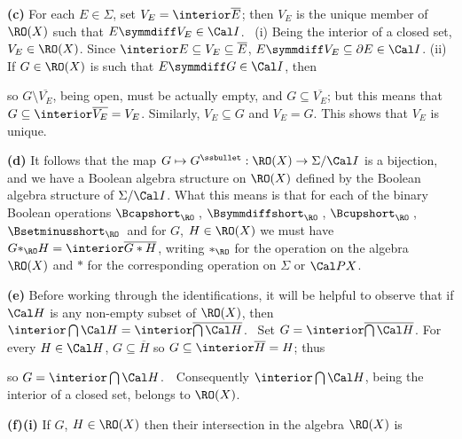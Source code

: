 {\medskip

{\bf (c)} For each $E\in\Sigma$, set $V_E=\interior\overline{E}$;  then
$V_E$ is the unique member of $\RO(X)$ such that
$E\symmdiff V_E\in\Cal I$.
\Prf\ (i) Being the interior of a closed set, $V_E\in\RO(X)$.
Since $\interior E\subseteq V_E\subseteq\overline{E}$,
$E\symmdiff V_E\subseteq\partial E\in\Cal I$.   (ii) If $G\in\RO(X)$ is such that $E\symmdiff G\in\Cal I$, then


\noindent so $G\setminus\overline{V_E}$, being open, must be actually
empty, and $G\subseteq\overline{V_E}$;  but this means that
$G\subseteq\interior\overline{V_E}=V_E$.   Similarly, $V_E\subseteq G$
and $V_E=G$.   This shows that $V_E$ is unique.\ \Qed

\medskip

{\bf (d)} It follows that the map
$G\mapsto G^{\ssbullet}:\RO(X)\to\Sigma/\Cal I$ is a bijection, and we have a Boolean algebra
structure on $\RO(X)$ defined by the Boolean algebra structure of
$\Sigma/\Cal I$.  What this means is that for each of the binary Boolean
operations $\Bcapshort_{\RO}\hskip.2em$,
$\Bsymmdiffshort_{\RO}\hskip.2em$, $\Bcupshort_{\RO}\hskip.2em$,
$\Bsetminusshort_{\RO}\hskip.2em$ and for $G$,
$H\in\RO(X)$ we must have
$G{*}_{\RO}H=\interior\overline{G*H}$,
writing ${*}_{\RO}$ for the operation on the algebra
$\RO(X)$ and $*$ for the corresponding operation on $\Sigma$ or
$\Cal PX$.

\medskip

{\bf (e)} Before working through the identifications, it will be helpful
to observe that if $\Cal H$ is any non-empty subset of $\RO(X)$, then
$\interior\bigcap\Cal H=\interior\overline{\bigcap\Cal H}$.   \Prf\ Set
$G=\interior\overline{\bigcap\Cal H}$.   For every $H\in\Cal H$,
$G\subseteq\overline{H}$ so $G\subseteq\interior\overline{H}=H$;  thus


\noindent so $G=\interior\bigcap\Cal H$.\ \QeD\
Consequently $\interior\bigcap\Cal H$, being the interior of a closed
set, belongs to $\RO(X)$.

\medskip

{\bf (f)(i)} If $G$, $H\in\RO(X)$ then their intersection in the
algebra $\RO(X)$ is


}
